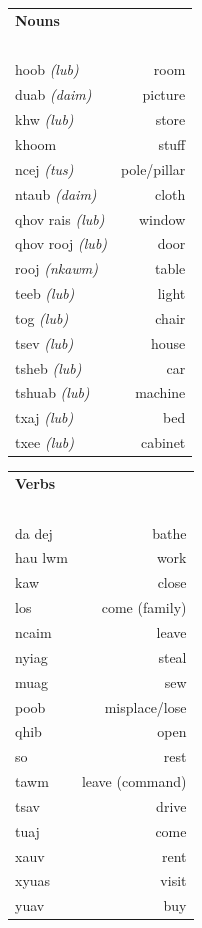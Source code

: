 \documentclass{article}
\begin{document}
\begin{multicols}{2}
[
\section*{}
\begin{center}\rule{\textwidth}{.4pt}\end{center}
]

\begin{tabular}{l r}
\textbf{Nouns} \\
~\\
hoob {\em (lub)} &room\\
duab {\em (daim)} &picture\\
khw {\em (lub)} &store\\
khoom &stuff\\
ncej {\em (tus)} &pole/pillar\\
ntaub {\em (daim)} &cloth\\
qhov rais {\em (lub)} &window\\
qhov rooj {\em (lub)} &door\\
rooj {\em (nkawm)} &table\\
teeb {\em (lub)} &light\\
tog {\em (lub)} &chair\\
tsev {\em (lub)} &house\\
tsheb {\em (lub)} &car\\
tshuab {\em (lub)} &machine\\
txaj {\em (lub)} &bed\\
txee {\em (lub)} &cabinet\\
\end{tabular}

\begin{tabular}{l r}
\textbf{Verbs} \\
~\\
da dej &bathe\\
hau lwm &work\\
kaw &close\\
los &come (family)\\
ncaim &leave\\
nyiag &steal\\
muag &sew\\
poob &misplace/lose\\
qhib &open\\
so &rest\\
tawm &leave (command)\\
tsav &drive\\
tuaj &come\\
xauv &rent\\
xyuas &visit\\
yuav &buy\\
\end{tabular}
\end{multicols}
\end{document}
